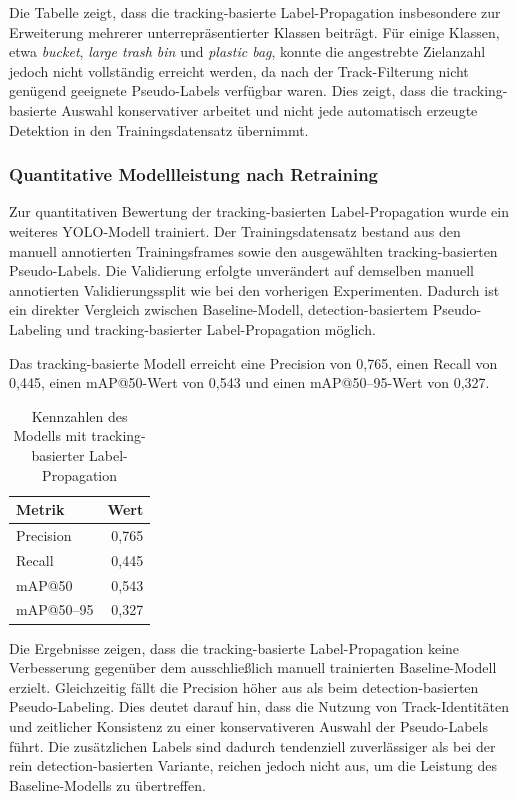 Die Tabelle zeigt, dass die tracking-basierte Label-Propagation insbesondere zur
Erweiterung mehrerer unterrepräsentierter Klassen beiträgt. Für einige Klassen,
etwa \textit{bucket}, \textit{large trash bin} und \textit{plastic bag}, konnte die
angestrebte Zielanzahl jedoch nicht vollständig erreicht werden, da nach der
Track-Filterung nicht genügend geeignete Pseudo-Labels verfügbar waren. Dies
zeigt, dass die tracking-basierte Auswahl konservativer arbeitet und nicht jede
automatisch erzeugte Detektion in den Trainingsdatensatz übernimmt.

\subsubsection{Quantitative Modellleistung nach Retraining}

Zur quantitativen Bewertung der tracking-basierten Label-Propagation wurde ein
weiteres YOLO-Modell trainiert. Der Trainingsdatensatz bestand aus den manuell
annotierten Trainingsframes sowie den ausgewählten tracking-basierten
Pseudo-Labels. Die Validierung erfolgte unverändert auf demselben manuell
annotierten Validierungssplit wie bei den vorherigen Experimenten. Dadurch ist
ein direkter Vergleich zwischen Baseline-Modell, detection-basiertem Pseudo-Labeling
und tracking-basierter Label-Propagation möglich.

Das tracking-basierte Modell erreicht eine Precision von 0{,}765, einen Recall von
0{,}445, einen mAP@50-Wert von 0{,}543 und einen mAP@50--95-Wert von 0{,}327.

\begin{table}[H]
    \centering
    \caption{Kennzahlen des Modells mit tracking-basierter Label-Propagation}
    \label{tab:tracking_metrics}
    \begin{tabular}{lr}
        \hline
        \textbf{Metrik} & \textbf{Wert} \\
        \hline
        Precision       & 0{,}765       \\
        Recall          & 0{,}445       \\
        mAP@50          & 0{,}543       \\
        mAP@50--95      & 0{,}327       \\
        \hline
    \end{tabular}
\end{table}

Die Ergebnisse zeigen, dass die tracking-basierte Label-Propagation keine
Verbesserung gegenüber dem ausschließlich manuell trainierten Baseline-Modell
erzielt. Gleichzeitig fällt die Precision höher aus als beim detection-basierten
Pseudo-Labeling. Dies deutet darauf hin, dass die Nutzung von Track-Identitäten
und zeitlicher Konsistenz zu einer konservativeren Auswahl der Pseudo-Labels
führt. Die zusätzlichen Labels sind dadurch tendenziell zuverlässiger als bei der
rein detection-basierten Variante, reichen jedoch nicht aus, um die Leistung des
Baseline-Modells zu übertreffen.

